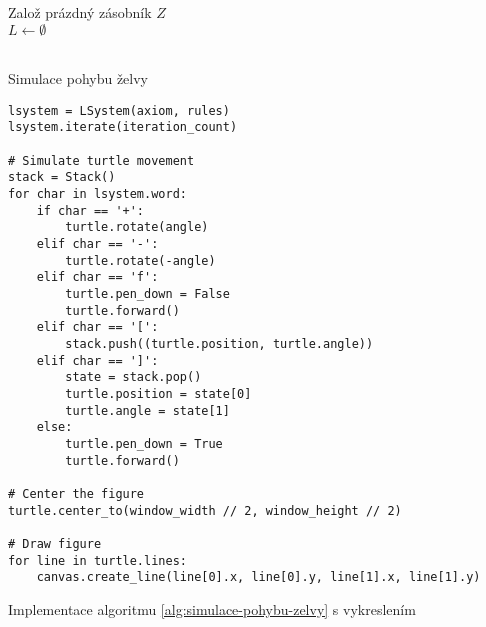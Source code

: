 \begin{algorithm}[h]
    Založ prázdný zásobník $Z$\\
    $L\gets\emptyset$\\
    \\
    \caption{Simulace pohybu želvy}
    \label{alg:simulace-pohybu-zelvy}
\end{algorithm}
\begin{program}[h]
\begin{lstlisting}[style=python]
lsystem = LSystem(axiom, rules)
lsystem.iterate(iteration_count)

# Simulate turtle movement
stack = Stack()
for char in lsystem.word:
    if char == '+':
        turtle.rotate(angle)
    elif char == '-':
        turtle.rotate(-angle)
    elif char == 'f':
        turtle.pen_down = False
        turtle.forward()
    elif char == '[':
        stack.push((turtle.position, turtle.angle))
    elif char == ']':
        state = stack.pop()
        turtle.position = state[0]
        turtle.angle = state[1]
    else:
        turtle.pen_down = True
        turtle.forward()

# Center the figure        
turtle.center_to(window_width // 2, window_height // 2)

# Draw figure
for line in turtle.lines:
    canvas.create_line(line[0].x, line[0].y, line[1].x, line[1].y)
\end{lstlisting}
    \caption{Implementace algoritmu \ref{alg:simulace-pohybu-zelvy} s vykreslením}
    \label{prog:simulace-pohybu-zelvy-a-vykresleni}
\end{program}